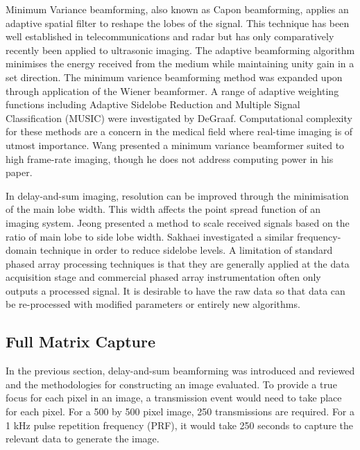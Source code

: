 Minimum Variance beamforming, also known as Capon beamforming\cite{vignon_capon_2008}, applies an adaptive spatial filter to reshape the lobes of the signal\cite{sasso_medical_2005,asl_minimum_2009}. This technique has been well established in telecommunications and radar but has only comparatively recently been applied to ultrasonic imaging\cite{synnevag_minimum_2005}. The adaptive beamforming algorithm minimises the energy received from the medium while maintaining unity gain in a set direction. The minimum varience beamforming method was expanded upon through application of the Wiener beamformer\cite{nilsen_wiener_2010}. A range of adaptive weighting functions including Adaptive Sidelobe Reduction and Multiple Signal Classification (MUSIC) were investigated by DeGraaf\cite{degraaf_sidelobe_1994}. Computational complexity for these methods are a concern in the medical field\cite{nilsen_beamspace_2009} where real-time imaging is of utmost importance. Wang presented a minimum variance beamformer suited to high frame-rate imaging\cite{wang_mvdr-based_2009}, though he does not address computing power in his paper.

In delay-and-sum imaging, resolution can be improved through the minimisation of the main lobe width. This width affects the point spread function of an imaging system\cite{sakhaei_optimization_2006}. Jeong presented a method to scale received signals based on the ratio of main lobe to side lobe width\cite{jeong_fourier_2000}. Sakhaei investigated a similar frequency-domain technique in order to reduce sidelobe levels\cite{sakhaei_optimum_2012}.
A limitation of standard phased array processing techniques is that they are generally applied at the data acquisition stage and commercial phased array instrumentation often only outputs a processed signal. It is desirable to have the raw data so that data can be re-processed with modified parameters or entirely new algorithms.


\subsection{Full Matrix Capture}\label{sec:FMC}

In the previous section, delay-and-sum beamforming was introduced and reviewed and the methodologies for constructing an image evaluated. To provide a true focus for each pixel in an image, a transmission event would need to take place for each pixel. For a 500 by 500 pixel image, 250 transmissions are required. For a 1 kHz pulse repetition frequency (PRF), it would take 250 seconds to capture the relevant data to generate the image.

